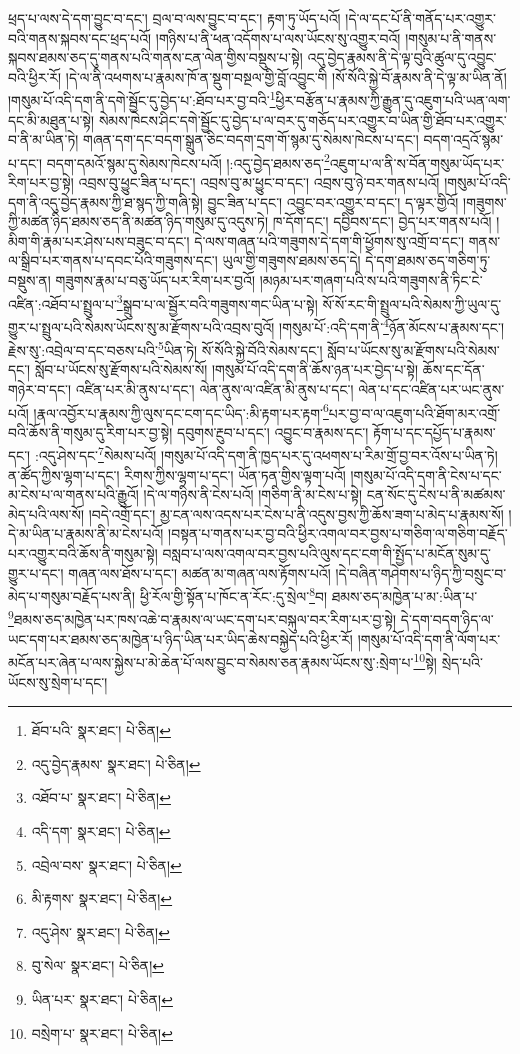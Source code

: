 ཕྲད་པ་ལས་དེ་དག་བྱུང་བ་དང་། བྲལ་བ་ལས་བྱུང་བ་དང་། རྟག་ཏུ་ཡོད་པའོ། །དེ་ལ་དང་པོ་ནི་གནོད་པར་འགྱུར་བའི་གནས་སྐབས་དང་ཕྲད་པའོ། །གཉིས་པ་ནི་ཕན་འདོགས་པ་ལས་ཡོངས་སུ་འགྱུར་བའོ། །གསུམ་པ་ནི་གནས་སྐབས་ཐམས་ཅད་དུ་གནས་པའི་གནས་ངན་ལེན་གྱིས་བསྡུས་པ་སྟེ། འདུ་བྱེད་རྣམས་ནི་དེ་ལྟ་བུའི་ཚུལ་དུ་འབྱུང་བའི་ཕྱིར་རོ། །དེ་ལ་ནི་འཕགས་པ་རྣམས་ཁོ་ན་སྡུག་བསྔལ་གྱི་བློ་འབྱུང་གི །སོ་སོའི་སྐྱེ་བོ་རྣམས་ནི་དེ་ལྟ་མ་ཡིན་ནོ། །གསུམ་པོ་འདི་དག་ནི་དགེ་སྦྱོང་དུ་བྱེད་པ་:ཐོབ་པར་བྱ་བའི་\footnote{ཐོབ་པའི་  སྣར་ཐང་།  པེ་ཅིན། }ཕྱིར་བརྩོན་པ་རྣམས་ཀྱི་རྒྱུན་དུ་འཇུག་པའི་ཡན་ལག་དང་མི་མཐུན་པ་སྟེ། སེམས་ཁེངས་ཤིང་དགེ་སྦྱོང་དུ་བྱེད་པ་ལ་བར་དུ་གཅོད་པར་འགྱུར་བ་ཡིན་གྱི་ཐོབ་པར་འགྱུར་བ་ནི་མ་ཡིན་ཏེ། གཞན་དག་དང་བདག་སྒྲུན་ཅིང་བདག་དྲག་གོ་སྙམ་དུ་སེམས་ཁེངས་པ་དང་། བདག་འདྲའོ་སྙམ་པ་དང་། བདག་དམའོ་སྙམ་དུ་སེམས་ཁེངས་པའོ། །:འདུ་བྱེད་ཐམས་ཅད་\footnote{འདུ་བྱེད་རྣམས་  སྣར་ཐང་།  པེ་ཅིན། }འཇུག་པ་ལ་ནི་ས་བོན་གསུམ་ཡོད་པར་རིག་པར་བྱ་སྟེ། འབྲས་བུ་ཕྱུང་ཟིན་པ་དང་། འབྲས་བུ་མ་ཕྱུང་བ་དང་། འབྲས་བུ་ཉེ་བར་གནས་པའོ། །གསུམ་པོ་འདི་དག་ནི་འདུ་བྱེད་རྣམས་ཀྱི་ཐ་སྙད་ཀྱི་གཞི་སྟེ། བྱུང་ཟིན་པ་དང་། འབྱུང་བར་འགྱུར་བ་དང་། ད་ལྟར་གྱིའོ། །གཟུགས་ཀྱི་མཚན་ཉིད་ཐམས་ཅད་ནི་མཚན་ཉིད་གསུམ་དུ་འདུས་ཏེ། ཁ་དོག་དང་། དབྱིབས་དང་། བྱེད་པར་གནས་པའོ། །མིག་གི་རྣམ་པར་ཤེས་པས་བཟུང་བ་དང་། དེ་ལས་གཞན་པའི་གཟུགས་དེ་དག་གི་ཕྱོགས་སུ་འགྲོ་བ་དང་། གནས་ལ་སྒྲིབ་པར་གནས་པ་དབང་པོའི་གཟུགས་དང་། ཡུལ་གྱི་གཟུགས་ཐམས་ཅད་དེ། དེ་དག་ཐམས་ཅད་གཅིག་ཏུ་བསྡུས་ན། གཟུགས་རྣམ་པ་བཅུ་ཡོད་པར་རིག་པར་བྱའོ། །མཉམ་པར་གཞག་པའི་ས་པའི་གཟུགས་ནི་ཏིང་ངེ་འཛིན་:འཐོབ་པ་སྤྲུལ་པ་\footnote{འཐོབ་པ་  སྣར་ཐང་།  པེ་ཅིན། }སྒྲུབ་པ་ལ་སྦྱོར་བའི་གཟུགས་གང་ཡིན་པ་སྟེ། སོ་སོ་རང་གི་སྤྲུལ་པའི་སེམས་ཀྱི་ཡུལ་དུ་གྱུར་པ་སྤྲུལ་པའི་སེམས་ཡོངས་སུ་མ་རྫོགས་པའི་འབྲས་བུའོ། །གསུམ་པོ་:འདི་དག་ནི་\footnote{འདི་དག་  སྣར་ཐང་།  པེ་ཅིན། }ཉོན་མོངས་པ་རྣམས་དང་། རྗེས་སུ་:འབྲེལ་བ་དང་བཅས་པའི་\footnote{འབྲེལ་བས་  སྣར་ཐང་།  པེ་ཅིན། }ཡིན་ཏེ། སོ་སོའི་སྐྱེ་བོའི་སེམས་དང་། སློབ་པ་ཡོངས་སུ་མ་རྫོགས་པའི་སེམས་དང་། སློབ་པ་ཡོངས་སུ་རྫོགས་པའི་སེམས་སོ། །གསུམ་པོ་འདི་དག་ནི་ཆོས་ཉན་པར་བྱེད་པ་སྟེ། ཆོས་དང་དོན་གཉེར་བ་དང་། འཛིན་པར་མི་ནུས་པ་དང་། ལེན་ནུས་ལ་འཛིན་མི་ནུས་པ་དང་། ལེན་པ་དང་འཛིན་པར་ཡང་ནུས་པའོ། །རྣལ་འབྱོར་པ་རྣམས་ཀྱི་ལུས་དང་ངག་དང་ཡིད་:མི་རྟག་པར་རྟག་\footnote{མི་རྟགས་  སྣར་ཐང་།  པེ་ཅིན། }པར་བྱ་བ་ལ་འཇུག་པའི་ཐོག་མར་འགྲོ་བའི་ཆོས་ནི་གསུམ་དུ་རིག་པར་བྱ་སྟེ། དབུགས་རྔུབ་པ་དང་། འབྱུང་བ་རྣམས་དང་། རྟོག་པ་དང་དཔྱོད་པ་རྣམས་དང་། :འདུ་ཤེས་དང་\footnote{འདུ་ཤེས་  སྣར་ཐང་།  པེ་ཅིན། }སེམས་པའོ། །གསུམ་པོ་འདི་དག་ནི་ཁྱད་པར་དུ་འཕགས་པ་རིམ་གྲོ་བྱ་བར་འོས་པ་ཡིན་ཏེ། ན་ཚོད་ཀྱིས་ལྷག་པ་དང་། རིགས་ཀྱིས་ལྷག་པ་དང་། ཡོན་ཏན་གྱིས་ལྟག་པའོ། །གསུམ་པོ་འདི་དག་ནི་ངེས་པ་དང་མ་ངེས་པ་ལ་གནས་པའི་རྒྱུའོ། །དེ་ལ་གཉིས་ནི་ངེས་པའོ། །གཅིག་ནི་མ་ངེས་པ་སྟེ། ངན་སོང་དུ་ངེས་པ་ནི་མཚམས་མེད་པའི་ལས་སོ། །བདེ་འགྲོ་དང་། མྱ་ངན་ལས་འདས་པར་ངེས་པ་ནི་འདུས་བྱས་ཀྱི་ཆོས་ཟག་པ་མེད་པ་རྣམས་སོ། །དེ་མ་ཡིན་པ་རྣམས་ནི་མ་ངེས་པའོ། །བསྟན་པ་གནས་པར་བྱ་བའི་ཕྱིར་འགལ་བར་བྱས་པ་གཅིག་ལ་གཅིག་བརྗོད་པར་འགྱུར་བའི་ཆོས་ནི་གསུམ་སྟེ། བསླབ་པ་ལས་འགལ་བར་བྱས་པའི་ལུས་དང་ངག་གི་སྤྱོད་པ་མངོན་སུམ་དུ་གྱུར་པ་དང་། གཞན་ལས་ཐོས་པ་དང་། མཚན་མ་གཞན་ལས་རྟོགས་པའོ། །དེ་བཞིན་གཤེགས་པ་ཉིད་ཀྱི་བསྲུང་བ་མེད་པ་གསུམ་བརྗོད་པས་ནི། ཕྱི་རོལ་གྱི་སྟོན་པ་ཁོང་ན་རོང་:དུ་སྲེལ་\footnote{བུ་སེལ་  སྣར་ཐང་།  པེ་ཅིན། }བ། ཐམས་ཅད་མཁྱེན་པ་མ་:ཡིན་པ་\footnote{ཡིན་པར་  སྣར་ཐང་།  པེ་ཅིན། }ཐམས་ཅད་མཁྱེན་པར་ཁས་འཆེ་བ་རྣམས་ལ་ཡང་དག་པར་བསྐུལ་བར་རིག་པར་བྱ་སྟེ། དེ་དག་བདག་ཉིད་ལ་ཡང་དག་པར་ཐམས་ཅད་མཁྱེན་པ་ཉིད་ཡིན་པར་ཡིད་ཆེས་བསྐྱེད་པའི་ཕྱིར་རོ། །གསུམ་པོ་འདི་དག་ནི་ལོག་པར་མངོན་པར་ཞེན་པ་ལས་སྐྱེས་པ་མེ་ཆེན་པོ་ལས་བྱུང་བ་སེམས་ཅན་རྣམས་ཡོངས་སུ་:སྲེག་པ་\footnote{བསྲེག་པ་  སྣར་ཐང་།  པེ་ཅིན། }སྟེ། སྲེད་པའི་ཡོངས་སུ་སྲེག་པ་དང་། 